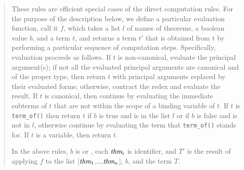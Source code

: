 \begin{quote}\rm
These rules are efficient special cases of the direct computation
rules.  For the purpose of the description below, we define a particular
evaluation function, call it $f$, which takes a list $l$ of names of
theorems, a boolean value $b$, and a term $t$, and returns a term $t'$ that
is obtained from t by performing a particular sequence of computation
steps.  Specifically, evaluation proceeds as follows.  If $t$ is
non-canonical, evaluate the principal argument(s); if not all the evaluated
principal arguments are canonical and of the proper type, then return $t$
with principal arguments replaced by their evaluated forms; otherwise,
contract the redex and evaluate the result.  If $t$ is canonical, then
continue by evaluating the immediate subterms of $t$ that are not within
the scope of a binding variable of $t$.  If $t$ is {\tt term\_of()}
then return $t$ if $b$ is true and  is in the list $l$ or if $b$ is
false and  is not in $l$, otherwise continue by evaluating the term
that {\tt term\_of()} stands for.  If $t$ is a variable, then
return $t$.

In the above rules, $b$ is  or , each $\hbox{\it thm}_i$ is
identifier, and $T'$ is the result of applying $f$ to the list
[$\hbox{\it thm}_1$,\ldots,$\hbox{\it thm}_n$], $b$, and the term $T$.

\end{quote}


